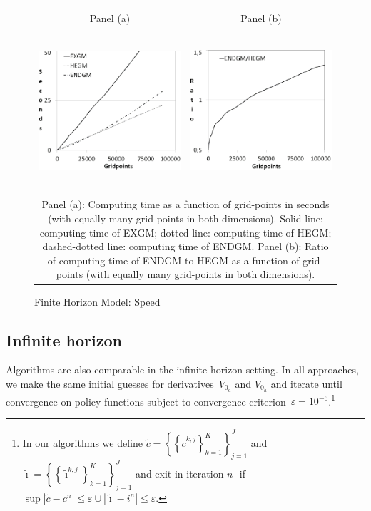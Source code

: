 \documentclass[a4paper,12pt]{article}%
\begin{document}
\begin{figure}[htb] \centering
\caption{Finite Horizon Model: Speed}
\begin{tabular}
[c]{cc}
& \\
Panel (a) & Panel (b)\\
{\includegraphics[height=6.0cm, width=6.0cm]{Abbildungen/speed_all_finite.eps}} & {\includegraphics[height=6.0cm, width=6.0cm]{Abbildungen/rel_endgm_HEgm.eps}} \\
\multicolumn{2}{p{15cm}}{{\footnotesize Panel (a): Computing time as a function of grid-points in seconds (with equally many grid-points in both dimensions). Solid line: computing time of EXGM; dotted line: computing time of HEGM; dashed-dotted line: computing time of ENDGM. Panel (b): Ratio of computing time of ENDGM to HEGM as a function of grid-points (with equally many grid-points in both dimensions).}}
\end{tabular}
\label{graph_finte}
\end{figure}

\subsection{Infinite horizon}

Algorithms are also comparable in the infinite horizon setting. In all approaches, we make the same initial guesses for derivatives~$V_{0_{a}}$ and $V_{0_{h}}$ and iterate until convergence on policy functions subject to convergence criterion~$\varepsilon=10^{-6}$.\footnote{In our algorithms we define $\tilde{c}=\left\{  \left\{ \tilde{c}^{k,j}\right\}  _{k=1}^{K}\right\}  _{j=1}^{J}$ and $\tilde{\imath}=\left\{  \left\{  \tilde{\imath}^{k,j}\right\}  _{k=1}^{K}\right\}  _{j=1}^{J}$ and exit in iteration $n\,$\ if $\sup|\tilde{c}-c^{n}|\leq\varepsilon\cup|\tilde{\imath}-i^{n}|\leq\varepsilon.$}
\end{document}
